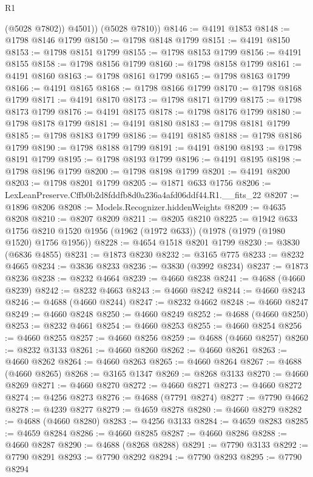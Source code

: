\begin{lexlean}{R1}
\begin{coremodule}
            (@5028 @7802))
          @4501))
      (@5028 @7810))
@8146 := @4191 @1853
@8148 := @1798 @8146 @1799
@8150 := @1798 @8148 @1799
@8151 := @4191 @8150
@8153 := @1798 @8151 @1799
@8155 := @1798 @8153 @1799
@8156 := @4191 @8155
@8158 := @1798 @8156 @1799
@8160 := @1798 @8158 @1799
@8161 := @4191 @8160
@8163 := @1798 @8161 @1799
@8165 := @1798 @8163 @1799
@8166 := @4191 @8165
@8168 := @1798 @8166 @1799
@8170 := @1798 @8168 @1799
@8171 := @4191 @8170
@8173 := @1798 @8171 @1799
@8175 := @1798 @8173 @1799
@8176 := @4191 @8175
@8178 := @1798 @8176 @1799
@8180 := @1798 @8178 @1799
@8181 := @4191 @8180
@8183 := @1798 @8181 @1799
@8185 := @1798 @8183 @1799
@8186 := @4191 @8185
@8188 := @1798 @8186 @1799
@8190 := @1798 @8188 @1799
@8191 := @4191 @8190
@8193 := @1798 @8191 @1799
@8195 := @1798 @8193 @1799
@8196 := @4191 @8195
@8198 := @1798 @8196 @1799
@8200 := @1798 @8198 @1799
@8201 := @4191 @8200
@8203 := @1798 @8201 @1799
@8205 := @1871 @633 @1756
@8206 := LexLeanPreserve.Cffb0b2d8fddfb8d0a236a4afd06ddf44.R1.__fits_22
@8207 := @1896 @8206
@8208 := Models.Recognizer.hiddenWeights
@8209 := @4635 @8208
@8210 := @8207 @8209
@8211 := @8205 @8210
@8225 := @1942
    @633
    @1756
    @8210
    @1520
    @1956
    (@1962 (@1972 @633))
    (@1978 (@1979 (@1980 @1520) @1756 @1956))
@8228 := @4654 @1518 @8201 @1799
@8230 := @3830 (@6836 @4855)
@8231 := @1873 @8230
@8232 := @3165 @775
@8233 := @8232 @4665
@8234 := @3836 @8233
@8236 := @3830 (@3992 @8234)
@8237 := @1873 @8236
@8238 := @8232 @4664
@8239 := @4660 @8238
@8241 := @4688 (@4660 @8239)
@8242 := @8232 @4663
@8243 := @4660 @8242
@8244 := @4660 @8243
@8246 := @4688 (@4660 @8244)
@8247 := @8232 @4662
@8248 := @4660 @8247
@8249 := @4660 @8248
@8250 := @4660 @8249
@8252 := @4688 (@4660 @8250)
@8253 := @8232 @4661
@8254 := @4660 @8253
@8255 := @4660 @8254
@8256 := @4660 @8255
@8257 := @4660 @8256
@8259 := @4688 (@4660 @8257)
@8260 := @8232 @3133
@8261 := @4660 @8260
@8262 := @4660 @8261
@8263 := @4660 @8262
@8264 := @4660 @8263
@8265 := @4660 @8264
@8267 := @4688 (@4660 @8265)
@8268 := @3165 @1347
@8269 := @8268 @3133
@8270 := @4660 @8269
@8271 := @4660 @8270
@8272 := @4660 @8271
@8273 := @4660 @8272
@8274 := @4256 @8273
@8276 := @4688 (@7791 @8274)
@8277 := @7790 @4662
@8278 := @4239 @8277
@8279 := @4659 @8278
@8280 := @4660 @8279
@8282 := @4688 (@4660 @8280)
@8283 := @4256 @3133
@8284 := @4659 @8283
@8285 := @4659 @8284
@8286 := @4660 @8285
@8287 := @4660 @8286
@8288 := @4660 @8287
@8290 := @4688 (@8268 @8288)
@8291 := @7790 @3133
@8292 := @7790 @8291
@8293 := @7790 @8292
@8294 := @7790 @8293
@8295 := @7790 @8294

\end{coremodule}
\end{lexlean}
